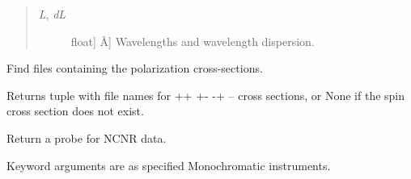 \documentclass[letterpaper,10pt,english]{sphinxmanual}
\begin{document}
\begin{fulllineitems}
\begin{fulllineitems}
\begin{quote}
\begin{description}
\begin{description}
\item[{\emph{L}, \emph{dL}}] \leavevmode{[}{[}float{]} \textbar{} Å{]}
Wavelengths and wavelength dispersion.

\end{description}

\end{description}\end{quote}

\end{fulllineitems}


\end{fulllineitems}


\begin{fulllineitems}
\label{api/ncnrdata:refl1d.ncnrdata.find_xsec}
Find files containing the polarization cross-sections.

Returns tuple with file names for ++ +- -+ -- cross sections, or
None if the spin cross section does not exist.

\end{fulllineitems}


\begin{fulllineitems}
\label{api/ncnrdata:refl1d.ncnrdata.load}
Return a probe for NCNR data.

Keyword arguments are as specified Monochromatic instruments.

\end{fulllineitems}

\end{document}
